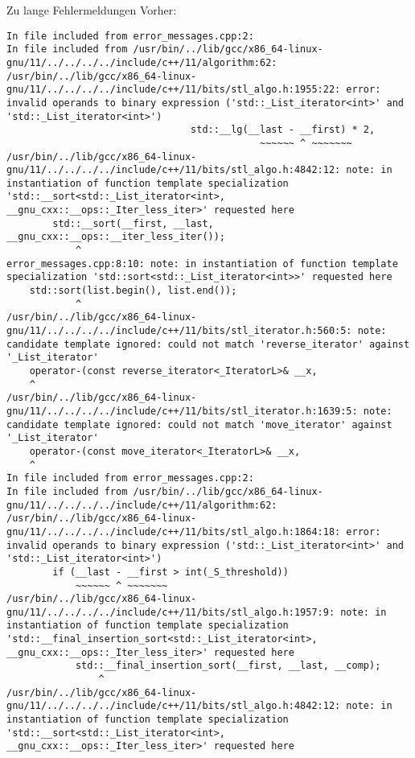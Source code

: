 \begin{frame}{Zu lange Fehlermeldungen}
    Vorher:
    \begin{verbatim}
In file included from error_messages.cpp:2:
In file included from /usr/bin/../lib/gcc/x86_64-linux-gnu/11/../../../../include/c++/11/algorithm:62:
/usr/bin/../lib/gcc/x86_64-linux-gnu/11/../../../../include/c++/11/bits/stl_algo.h:1955:22: error: invalid operands to binary expression ('std::_List_iterator<int>' and 'std::_List_iterator<int>')
                                std::__lg(__last - __first) * 2,
                                            ~~~~~~ ^ ~~~~~~~
/usr/bin/../lib/gcc/x86_64-linux-gnu/11/../../../../include/c++/11/bits/stl_algo.h:4842:12: note: in instantiation of function template specialization 'std::__sort<std::_List_iterator<int>, __gnu_cxx::__ops::_Iter_less_iter>' requested here
        std::__sort(__first, __last, __gnu_cxx::__ops::__iter_less_iter());
            ^
error_messages.cpp:8:10: note: in instantiation of function template specialization 'std::sort<std::_List_iterator<int>>' requested here
    std::sort(list.begin(), list.end());
            ^
/usr/bin/../lib/gcc/x86_64-linux-gnu/11/../../../../include/c++/11/bits/stl_iterator.h:560:5: note: candidate template ignored: could not match 'reverse_iterator' against '_List_iterator'
    operator-(const reverse_iterator<_IteratorL>& __x,
    ^
/usr/bin/../lib/gcc/x86_64-linux-gnu/11/../../../../include/c++/11/bits/stl_iterator.h:1639:5: note: candidate template ignored: could not match 'move_iterator' against '_List_iterator'
    operator-(const move_iterator<_IteratorL>& __x,
    ^
In file included from error_messages.cpp:2:
In file included from /usr/bin/../lib/gcc/x86_64-linux-gnu/11/../../../../include/c++/11/algorithm:62:
/usr/bin/../lib/gcc/x86_64-linux-gnu/11/../../../../include/c++/11/bits/stl_algo.h:1864:18: error: invalid operands to binary expression ('std::_List_iterator<int>' and 'std::_List_iterator<int>')
        if (__last - __first > int(_S_threshold))
            ~~~~~~ ^ ~~~~~~~
/usr/bin/../lib/gcc/x86_64-linux-gnu/11/../../../../include/c++/11/bits/stl_algo.h:1957:9: note: in instantiation of function template specialization 'std::__final_insertion_sort<std::_List_iterator<int>, __gnu_cxx::__ops::_Iter_less_iter>' requested here
            std::__final_insertion_sort(__first, __last, __comp);
                ^
/usr/bin/../lib/gcc/x86_64-linux-gnu/11/../../../../include/c++/11/bits/stl_algo.h:4842:12: note: in instantiation of function template specialization 'std::__sort<std::_List_iterator<int>, __gnu_cxx::__ops::_Iter_less_iter>' requested here

\end{verbatim}
\end{frame}
